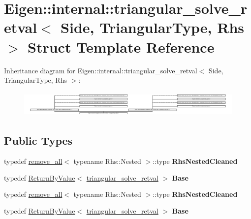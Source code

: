 \hypertarget{struct_eigen_1_1internal_1_1triangular__solve__retval}{}\section{Eigen\+:\+:internal\+:\+:triangular\+\_\+solve\+\_\+retval$<$ Side, Triangular\+Type, Rhs $>$ Struct Template Reference}
\label{struct_eigen_1_1internal_1_1triangular__solve__retval}
Inheritance diagram for Eigen\+:\+:internal\+:\+:triangular\+\_\+solve\+\_\+retval$<$ Side, Triangular\+Type, Rhs $>$\+:\begin{figure}[H]
\begin{center}
\leavevmode
\includegraphics[height=1.337580cm]{struct_eigen_1_1internal_1_1triangular__solve__retval}
\end{center}
\end{figure}
\subsection*{Public Types}
\begin{DoxyCompactItemize}
\item 
\mbox{\label{struct_eigen_1_1internal_1_1triangular__solve__retval_a271b468f839b82b4bab648151e3dd4f1}} 
typedef \hyperlink{struct_eigen_1_1internal_1_1remove__all}{remove\+\_\+all}$<$ typename Rhs\+::\+Nested $>$\+::type {\bfseries Rhs\+Nested\+Cleaned}
\item 
\mbox{\label{struct_eigen_1_1internal_1_1triangular__solve__retval_a6a2d39093c4dca2f29958baece6d1f1d}} 
typedef \hyperlink{group___core___module_class_eigen_1_1_return_by_value}{Return\+By\+Value}$<$ \hyperlink{struct_eigen_1_1internal_1_1triangular__solve__retval}{triangular\+\_\+solve\+\_\+retval} $>$ {\bfseries Base}
\item 
\mbox{\label{struct_eigen_1_1internal_1_1triangular__solve__retval_a271b468f839b82b4bab648151e3dd4f1}} 
typedef \hyperlink{struct_eigen_1_1internal_1_1remove__all}{remove\+\_\+all}$<$ typename Rhs\+::\+Nested $>$\+::type {\bfseries Rhs\+Nested\+Cleaned}
\item 
\mbox{\label{struct_eigen_1_1internal_1_1triangular__solve__retval_a6a2d39093c4dca2f29958baece6d1f1d}} 
typedef \hyperlink{group___core___module_class_eigen_1_1_return_by_value}{Return\+By\+Value}$<$ \hyperlink{struct_eigen_1_1internal_1_1triangular__solve__retval}{triangular\+\_\+solve\+\_\+retval} $>$ {\bfseries Base}
\end{DoxyCompactItemize}
